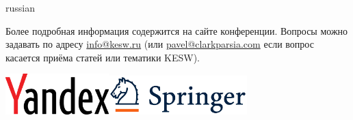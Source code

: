 \documentclass[a4paper, 10pt]{article}
\renewcommand{\skip}{\vspace{1ex}}
\begin{document}
\begin{otherlanguage*}{russian}
\vfill

\noindent Более подробная информация содержится на сайте конференции. Вопросы можно задавать по адресу \url{info@kesw.ru} (или \url{pavel@clarkparsia.com} если вопрос касается приёма статей или тематики KESW).

\skip \skip

\noindent
\includegraphics[width=0.3\textwidth]{yandex_eng_logo.eps}\hfill \includegraphics[width=0.4\textwidth]{springer.png}

\end{otherlanguage*}
\end{document}
